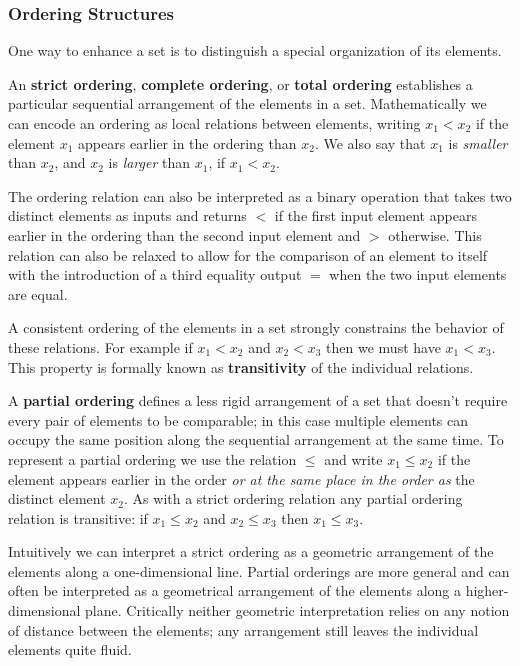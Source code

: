 \documentclass[
  letterpaper,
  DIV=11,
  numbers=noendperiod]{scrartcl}
\begin{document}
\hypertarget{ordering-structures}{%
\subsubsection{Ordering Structures}\label{ordering-structures}}

One way to enhance a set is to distinguish a special organization of its
elements.

An \textbf{strict ordering}, \textbf{complete ordering}, or
\textbf{total ordering} establishes a particular sequential arrangement
of the elements in a set. Mathematically we can encode an ordering as
local relations between elements, writing \(x_{1} < x_{2}\) if the
element \(x_{1}\) appears earlier in the ordering than \(x_{2}\). We
also say that \(x_{1}\) is \emph{smaller} than \(x_{2}\), and \(x_{2}\)
is \emph{larger} than \(x_{1}\), if \(x_{1} < x_{2}\).

The ordering relation can also be interpreted as a binary operation that
takes two distinct elements as inputs and returns \(<\) if the first
input element appears earlier in the ordering than the second input
element and \(>\) otherwise. This relation can also be relaxed to allow
for the comparison of an element to itself with the introduction of a
third equality output \(=\) when the two input elements are equal.

A consistent ordering of the elements in a set strongly constrains the
behavior of these relations. For example if \(x_{1} < x_{2}\) and
\(x_{2} < x_{3}\) then we must have \(x_{1} < x_{3}\). This property is
formally known as \textbf{transitivity} of the individual relations.

A \textbf{partial ordering} defines a less rigid arrangement of a set
that doesn't require every pair of elements to be comparable; in this
case multiple elements can occupy the same position along the sequential
arrangement at the same time. To represent a partial ordering we use the
relation \(\le\) and write \(x_{1} \le x_{2}\) if the element appears
earlier in the order \emph{or at the same place in the order as} the
distinct element \(x_{2}\). As with a strict ordering relation any
partial ordering relation is transitive: if \(x_{1} \le x_{2}\) and
\(x_{2} \le x_{3}\) then \(x_{1} \le x_{3}\).

Intuitively we can interpret a strict ordering as a geometric
arrangement of the elements along a one-dimensional line. Partial
orderings are more general and can often be interpreted as a geometrical
arrangement of the elements along a higher-dimensional plane. Critically
neither geometric interpretation relies on any notion of distance
between the elements; any arrangement still leaves the individual
elements quite fluid.
\end{document}
